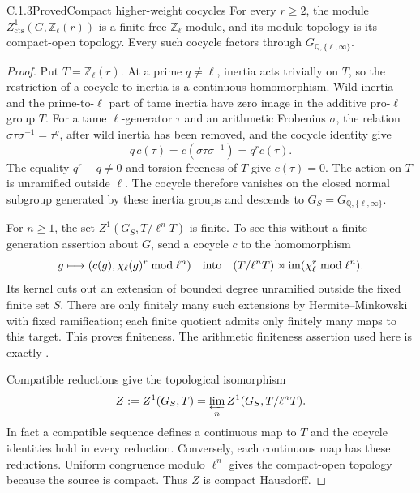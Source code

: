 \begin{result}{C.1.3}{Proved}{Compact higher-weight cocycles}
\label{lem:ghost-higher-z1}
For every \(r\geq2\), the module
\(Z^1_{\mathrm{cts}}(G,\mathbb Z_\ell(r))\) is a finite free
\(\mathbb Z_\ell\)-module, and its module topology is its
compact-open topology.  Every such cocycle factors through
\(G_{\mathbb Q,\{\ell,\infty\}}\).
\end{result}
\begin{proof}
Put \(T=\mathbb Z_\ell(r)\). At a prime \(q\ne\ell\), inertia
acts trivially on \(T\), so the restriction of a cocycle to inertia
is a continuous homomorphism. Wild inertia and the prime-to-\(\ell\)
part of tame inertia have zero image in the additive pro-\(\ell\)
group \(T\). For a tame \(\ell\)-generator \(\tau\) and an
arithmetic Frobenius \(\sigma\), the relation
\(\sigma\tau\sigma^{-1}=\tau^q\), after wild inertia has been
removed, and the cocycle identity give
\[
        q\,c(\tau)=c(\sigma\tau\sigma^{-1})
                    =q^r c(\tau).
\]
The equality \(q^r-q\ne0\) and torsion-freeness of \(T\) give
\(c(\tau)=0\). The action on \(T\) is unramified outside
\(\ell\). The cocycle therefore vanishes on the closed normal
subgroup generated by these inertia groups and descends to
\(G_S=G_{\mathbb Q,\{\ell,\infty\}}\).

For \(n\geq1\), the set \(Z^1(G_S,T/\ell^nT)\) is finite.
To see this without a finite-generation assertion about \(G\),
send a cocycle \(c\) to the homomorphism
\[
 g\longmapsto(c(g),\chi_\ell(g)^r\bmod\ell^n)
 \quad\hbox{into}\quad
 (T/\ell^nT)\rtimes\operatorname{im}(\chi_\ell^r\bmod\ell^n).
\]
Its kernel cuts out an extension of bounded degree unramified
outside the fixed finite set \(S\). There are only finitely many
such extensions by Hermite--Minkowski with fixed ramification;
each finite quotient admits only finitely many maps to this target.
This proves finiteness. The arithmetic finiteness assertion used
here is exactly \cite[Theorem~8.42]{GhostMilneANT}.

Compatible reductions give the topological isomorphism
\[
 Z:=Z^1(G_S,T)=\varprojlim_n Z^1(G_S,T/\ell^nT).
\]
In fact a compatible sequence defines a continuous map to \(T\)
and the cocycle identities hold in every reduction. Conversely,
each continuous map has these reductions. Uniform congruence
modulo \(\ell^n\) gives the compact-open topology because the
source is compact. Thus \(Z\) is compact Hausdorff.


\end{proof}
